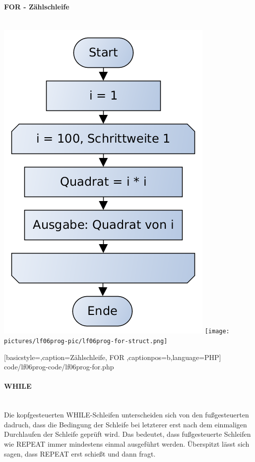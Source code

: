 \paragraph{FOR - Zählschleife}~\\

\includegraphics[scale=0.4]{pictures/lf06prog-pic/lf06prog-for-pap.png}
\texttt{[image: pictures/lf06prog-pic/lf06prog-for-struct.png]}


	[basicstyle=\small,caption={Zählschleife, FOR}
	\label{lst:while-fuss},captionpos=b,language=PHP]
	{code/lf06prog-code/lf06prog-for.php}

\paragraph{WHILE}~\\

Die kopfgesteuerten WHILE-Schleifen unterscheiden sich von den fußgesteuerten dadruch, dass die Bedingung der Schleife bei letzterer erst nach dem einmaligen Durchlaufen der Schleife geprüft wird. Das bedeutet, dass fußgesteuerte Schleifen wie REPEAT immer mindestens einmal ausgeführt werden. Überspitzt lässt sich sagen, dass REPEAT erst schießt und dann fragt.


